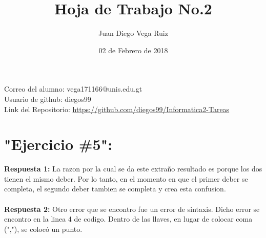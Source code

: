 \documentclass[12pt, a4paper]{article}
\author{Juan Diego Vega Ruiz}
\date{02 de Febrero de 2018}
\begin{document}
 
  \title{Hoja de Trabajo No.2} 
   \maketitle    
   Correo del alumno: vega171166@unis.edu.gt \\   
   Usuario de github: diegos99 \\
   Link del Repositorio: \href{https://github.com/diegos99/Informatica2-Tareas}{https://github.com/diegos99/Informatica2-Tareas}


    \section{"Ejercicio \#5":}
        \textbf{Respuesta 1:} La razon por la cual se da este 
        extraño resultado es porque los dos tienen el mismo deber.
        Por lo tanto, en el momento en que el primer deber se completa,
        el segundo deber tambien se completa y crea esta confusion.
        \\
        \\
        \textbf{Respuesta 2:} Otro error que se encontro fue un error de sintaxis.
        Dicho error se encontro en la linea 4 de codigo. Dentro de las llaves, en lugar de colocar coma (","),
        se colocó un punto.
\end{document}
